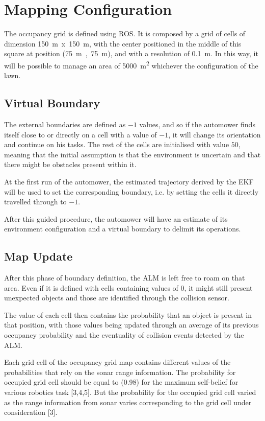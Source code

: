 \section{Mapping Configuration}
\label{sec:mapConf}

\noindent The occupancy grid is defined using \gls{ROS}. It is composed by a grid of cells of dimension \SI{150}{m}~x~\SI{150}{m}, with the center positioned in the middle of this square at position (\SI{75}{m}~,~\SI{75}{m}), and with a resolution of \SI{0.1}{m}. In this way, it will be possible to manage an area of \SI{5000}{m^2} whichever the configuration of the lawn.

\subsection{Virtual Boundary}
\noindent
The external boundaries are defined as $-1$ values, and so if the automower finds itself close to or directly on a cell with a value of $-1$, it will change its orientation and continue on his tasks.
The rest of the cells are initialised with value $50$, meaning that the initial assumption is that the environment is uncertain and that there might be obstacles present within it.

At the first run of the automower, the estimated trajectory derived by the EKF will be used to set the corresponding boundary, i.e. by setting the cells it directly travelled through to $-1$.

After this guided procedure, the automower will have an estimate of its environment configuration and a virtual boundary to delimit its operations.

\subsection{Map Update}
\noindent
After this phase of boundary definition, the \gls{ALM} is left free to roam on that area.
Even if it is defined with cells containing values of $0$, it might still present unexpected objects and those are identified through the collision sensor.

The value of each cell then contains the probability that an object is present in that position, with those values being updated through an average of its previous occupancy probability and the eventuality of collision events detected by the \gls{ALM}.

Each grid cell of the occupancy grid map contains different values of the probabilities that rely on the sonar range information. The probability for occupied grid cell should be equal to (0.98) for the maximum self-belief for various robotics task [3,4,5]. But the probability for the occupied grid cell varied as the range information from sonar varies corresponding to the grid cell under consideration [3].

